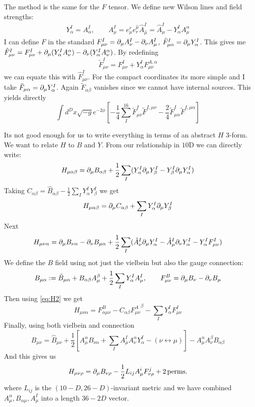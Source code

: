 \documentclass[11pt, class=article, crop=false]{standalone}
\begin{document}
\begin{enumerate}
	The method is the same for the $F$ tensor. We define new Wilson lines and field strengths:
	\[
	\begin{aligned}
		Y^I_\alpha = A^I_\alpha, \qquad A^I_\mu = e_\mu^r e^{\hat \mu}_r \hat A^I_{\hat \mu} = \hat A_\mu^I - Y^I_\alpha A^\alpha_\mu
	\end{aligned}
	\]
	I can define $F$ in the standard $F_{\mu \nu}^I = \partial_\mu A_\nu^I - \partial_\nu A_\mu^I$, $\tilde F_{\mu \alpha}^I = \partial_\mu Y_\alpha^I$. This gives me
	$\hat F_{\mu \nu}^I = F_{\mu \nu}^I + \partial_\mu (Y_\alpha^I A_\nu^\alpha) - \partial_\nu (Y_\alpha^I A_\nu^\alpha)$. By redefining 
	\[
		\tilde F^I_{\mu \nu} = F^I_{\mu \nu} + Y^I_\alpha F^{A, \alpha}_{\mu \nu}
	\]
	we can equate this with $\hat F_{\mu \nu}^I$. For the compact coordinates its more simple and I take $\tilde F_{\mu \alpha} = \partial_\mu Y^I_\alpha$. Again $\tilde F_{\alpha \beta}$ vanishes since we cannot have internal sources. This yields directly
	\[
		\int d^D x \sqrt{-g} e^{-2\phi}[-\frac14 \sum_I^{16} \tilde F^{I}_{\mu \nu} \tilde F^{I, \mu \nu} - \frac{2}{4} \tilde F^{I}_{\mu \alpha} \tilde F^{I, \mu \alpha}]
	\]
	
	Its not good enough for us to write everything in terms of an abstract $H$ 3-form. We want to relate $H$ to $B$ and $Y$. From our relationship in $10$D we can directly write:
	\[
	H_{\mu \alpha \beta} = \partial_\mu B_{\alpha \beta} + \frac12 \sum_{I} (Y^I_\alpha \partial_\mu Y^I_\beta - Y^I_\beta \partial_\mu Y^I_\alpha)
	\]
	Taking $C_{\alpha \beta} = \hat B_{\alpha \beta} - \frac12 \sum_I Y^I_\alpha Y^I_\beta$ we get
	\[
		H_{\mu \alpha \beta} = \partial_\mu C_{\alpha \beta} + \sum_I Y^I_\alpha \partial_\mu Y^I_\beta
	\]
	Next
	\[
		H_{\mu \nu \alpha} = \partial_\mu B_{\nu \alpha} - \partial_\nu B_{\mu \alpha} + \frac12 \sum_I (\hat A_\nu^I \partial_\mu Y^I_\alpha - \hat A^I_\mu \partial_\nu Y^I_\alpha - Y^I_\alpha F^I_{\mu \nu})
	\]
	We define the $B$ field using not just the vielbein but also the gauge connection:
	\[
		B_{\mu \alpha} := \hat B_{\mu \alpha} + B_{\alpha \beta} A^\beta_\mu + \frac12 \sum_I Y^I_\alpha A^I_\mu, \qquad F^B_{\mu \nu} = \partial_\mu B_\nu - \partial_\nu B_\mu
	\]
	Then using \eqref{eq:H2} we get
	\[
		H_{\mu \nu \alpha} = F^B_{\alpha \mu \nu} - C_{\alpha \beta} {F^{A}_{\mu \nu}}^\beta - \sum_I Y^I_\alpha F^I_{\mu \nu}
	\]
	Finally, using both vielbein and connection
	\[
		B_{\mu \nu} = \hat B_{\mu \nu} + \frac12 [A_\mu^\alpha B_{\nu \alpha} + \sum_{I} A_\mu^I A^\alpha_\nu Y^I_\alpha - (\nu \leftrightarrow \mu)] - A_\mu^\alpha A_\nu^\beta B_{\alpha \beta}
	\]
	And this gives us 
	\[
		H_{\mu \nu \rho} = \partial_\mu B_{\nu \rho} - \frac12 L_{ij} A^i_\mu F^j_{\nu \rho} + 2 \,\mathrm{perms.}
	\]
	where $L_{ij}$ is the $(10-D, 26 - D)$-invariant metric and we have combined $A^\alpha_\mu, B_{\alpha \mu}, A^I_\mu$ into a length $36-2D$ vector.
	

\end{enumerate}
\end{document}
